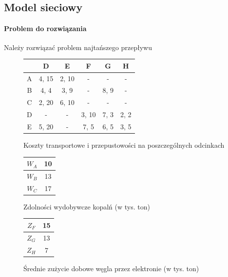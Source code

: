 \subsection{Model sieciowy}
\paragraph{Problem do rozwiązania}
Należy rozwiązać problem najtańszego przepływu \\
\begin{figure}[htb]
\caption{Koszty transportowe i przepustowości na poszczególnych odcinkach}
\begin{center}
\begin{tabular}{ | c | c | c | c | c | c | }
\hline
  & D & E & F & G & H \\ 
 \hline
 A & 4, 15 & 2, 10 & - & - & -\\  
 \hline
 B & 4, 4 & 3, 9 & - & 8, 9 & - \\
 \hline  
 C & 2, 20 & 6, 10 & - & - & - \\
 \hline  
 D & - & - & 3, 10 & 7, 3 & 2, 2 \\
 \hline  
 E & 5, 20 & - & 7, 5 & 6, 5 & 3, 5 \\
 \hline  
\end{tabular}
\end{center}
\end{figure}
\begin{figure}[htb]
\caption{Zdolności wydobywcze kopalń (w tys. ton)}
\begin{center}
\begin{tabular}{ | c | c |}
\hline
  $W_A$ & 10 \\
 \hline
$W_B$ & 13 \\
 \hline
 $W_C$ & 17 \\
 \hline  
\end{tabular}
\end{center}
\end{figure}
\begin{figure}[htb]
\caption{Średnie zużycie dobowe węgla przez elektronie (w tys. ton)}
\begin{center}
\begin{tabular}{ | c | c |}
\hline
  $Z_F$ & 15 \\
 \hline
$Z_G$ & 13 \\
 \hline
 $Z_H$ & 7 \\
 \hline  
\end{tabular}
\end{center}
\end{figure}
